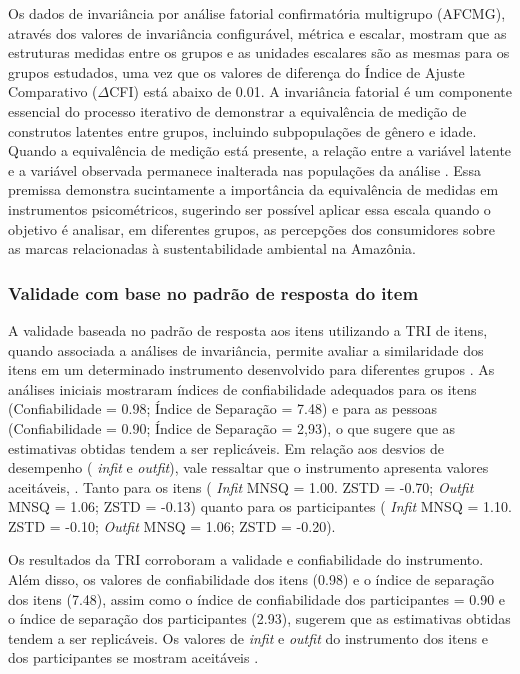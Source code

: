 Os dados de invariância por análise fatorial confirmatória multigrupo (AFCMG), através dos valores de invariância configurável, métrica e escalar, mostram que as estruturas medidas entre os grupos e as unidades escalares são as mesmas para os grupos estudados, uma vez que os valores de diferença do Índice de Ajuste Comparativo ($\Delta$CFI) está abaixo de 0.01. A invariância fatorial é um componente essencial do processo iterativo de demonstrar a equivalência de medição de construtos latentes entre grupos, incluindo subpopulações de gênero e idade.
Quando a equivalência de medição está presente, a relação entre a variável latente e a variável observada permanece inalterada nas populações da análise \cite{Raju2002MeasurementTheory}. Essa premissa demonstra sucintamente a importância da equivalência de medidas em instrumentos psicométricos, sugerindo ser possível aplicar essa escala quando o objetivo é analisar, em diferentes grupos, as percepções dos consumidores sobre as marcas relacionadas à sustentabilidade ambiental na Amazônia.

\subsubsection*{Validade com base no padrão de resposta do item}

A validade baseada no padrão de resposta aos itens utilizando a TRI de itens, quando associada a análises de invariância, permite avaliar a similaridade dos itens em um determinado instrumento desenvolvido para diferentes grupos \cite{Sireci2021UsingTest}. As análises iniciais mostraram índices de confiabilidade adequados para os itens (Confiabilidade = 0.98; Índice de Separação = 7.48) e para as pessoas (Confiabilidade = 0.90; Índice de Separação = 2,93), o que sugere que as estimativas obtidas tendem a ser replicáveis. Em relação aos desvios de desempenho ( \textit{infit} e \textit{outfit}), vale ressaltar que o instrumento apresenta valores aceitáveis, \cite{Bond2013ApplyingSciences,Boone2016RaschHow}. Tanto para os itens ( \textit{Infit} MNSQ = 1.00. ZSTD = -0.70; \textit{Outfit} MNSQ = 1.06; ZSTD = -0.13) quanto para os participantes ( \textit{Infit} MNSQ = 1.10. ZSTD = -0.10; \textit{Outfit} MNSQ = 1.06; ZSTD = -0.20).

Os resultados da TRI corroboram a validade e confiabilidade do instrumento. Além disso, os valores de confiabilidade dos itens (0.98) e o índice de separação dos itens (7.48), assim como o índice de confiabilidade dos participantes = 0.90 e o índice de separação dos participantes (2.93), sugerem que as estimativas obtidas tendem a ser replicáveis. Os valores de \textit{infit} e \textit{outfit} do instrumento dos itens e dos participantes se mostram aceitáveis \cite{Bond2013ApplyingSciences,Boone2016RaschHow}.

